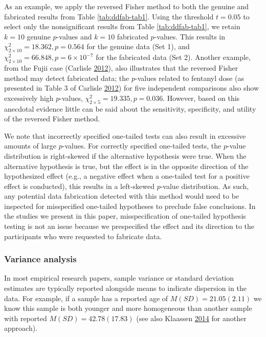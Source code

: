 \documentclass[a5paper]{book}
\begin{document}
As an example, we apply the reversed Fisher method to both the genuine
and fabricated results from Table \ref{tab:ddfab-tab1}. Using the
threshold \(t=0.05\) to select only the nonsignificant results from
Table \ref{tab:ddfab-tab1}, we retain \(k=10\) genuine \(p\)-values and
\(k=10\) fabricated \(p\)-values. This results in
\(\chi^2_{2\times10}=18.362,p=0.564\) for the genuine data (Set 1), and
\(\chi^2_{2\times10}=66.848,p=\ensuremath{6\times 10^{-7}}\) for the
fabricated data (Set 2). Another example, from the Fujii case (Carlisle
\protect\hyperlink{ref-doi:10.1111ux2fj.1365-2044.2012.07128.x}{2012}),
also illustrates that the reversed Fisher method may detect fabricated
data; the \(p\)-values related to fentanyl dose (as presented in Table 3
of Carlisle
\protect\hyperlink{ref-doi:10.1111ux2fj.1365-2044.2012.07128.x}{2012})
for five independent comparisons also show excessively high
\(p\)-values, \(\chi^2_{2\times5}=19.335, p=0.036\). However, based on
this anecdotal evidence little can be said about the sensitivity,
specificity, and utility of the reversed Fisher method.

We note that incorrectly specified one-tailed tests can also result in
excessive amounts of large \(p\)-values. For correctly specified
one-tailed tests, the \(p\)-value distribution is right-skewed if the
alternative hypothesis were true. When the alternative hypothesis is
true, but the effect is in the opposite direction of the hypothesized
effect (e.g., a negative effect when a one-tailed test for a positive
effect is conducted), this results in a left-skewed \(p\)-value
distribution. As such, any potential data fabrication detected with this
method would need to be inspected for misspecified one-tailed hypotheses
to preclude false conclusions. In the studies we present in this paper,
misspecification of one-tailed hypothesis testing is not an issue
because we prespecified the effect and its direction to the participants
who were requested to fabricate data.

\subsubsection{Variance analysis}\label{variance-analysis}

In most empirical research papers, sample variance or standard deviation
estimates are typically reported alongside means to indicate dispersion
in the data. For example, if a sample has a reported age of
\(M(SD)=21.05(2.11)\) we know this sample is both younger and more
homogeneous than another sample with reported \(M(SD)=42.78(17.83)\)
(see also Klaassen \protect\hyperlink{ref-klaassen2014evidential}{2014}
for another approach).
\end{document}
